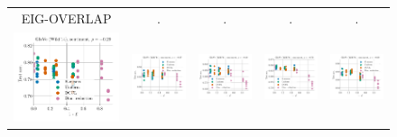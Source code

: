 \begin{figure}
	\centering
	\begin{tabular}{@{\hskip -0.0in}c@{\hskip -0.0in}c@{\hskip -0.0in}c@{\hskip -0.0in}c@{\hskip -0.0in}c@{\hskip -0.0in}}
		EIG-OVERLAP & . & . & . & .\\
		\includegraphics[width=.2\linewidth]{figures/glove400k_sentiment_mr_test-acc_vs_subspace-eig-overlap_linx.pdf} &
		\includegraphics[width=.2\linewidth]{figures/glove400k_sentiment_subj_test-acc_vs_subspace-eig-overlap_linx.pdf} &
		\includegraphics[width=.2\linewidth]{figures/glove400k_sentiment_cr_test-acc_vs_subspace-eig-overlap_linx.pdf} &
		\includegraphics[width=.2\linewidth]{figures/glove400k_sentiment_sst_test-acc_vs_subspace-eig-overlap_linx.pdf} &
		\includegraphics[width=.2\linewidth]{figures/glove400k_sentiment_mpqa_test-acc_vs_subspace-eig-overlap_linx.pdf} \\
		

\end{tabular}
\end{figure}
